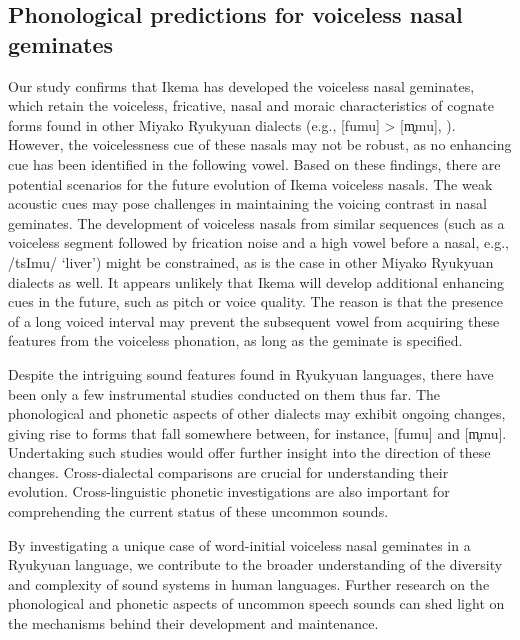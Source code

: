 \documentclass[output=paper]{langscibook}
\begin{document}
\subsection{Phonological predictions for voiceless nasal geminates}
\label{sec:shinohara:5.4}
Our study confirms that Ikema has developed the voiceless nasal geminates, which retain the voiceless, fricative, nasal and moraic characteristics of cognate forms found in other Miyako Ryukyuan dialects (e.g., [fumu] > [m̥mu], ). However, the voicelessness cue of these nasals may not be robust, as no enhancing cue has been identified in the following vowel. Based on these findings, there are potential scenarios for the future evolution of Ikema voiceless nasals. The weak acoustic cues may pose challenges in maintaining the voicing contrast in nasal geminates. The development of voiceless nasals from similar sequences (such as a voiceless segment followed by frication noise and a high vowel before a nasal, e.g., /tsImu/ ‘liver’) might be constrained, as is the case in other Miyako Ryukyuan dialects as well. It appears unlikely that Ikema will develop additional enhancing cues in the future, such as pitch or voice quality. The reason is that the presence of a long voiced interval may prevent the subsequent vowel from acquiring these features from the voiceless phonation, as long as the geminate is specified.

\begin{sloppypar}
Despite the intriguing sound features found in Ryukyuan languages, there have been only a few instrumental studies conducted on them thus far. The phonological and phonetic aspects of other dialects may exhibit ongoing changes, giving rise to forms that fall somewhere between, for instance, [fumu] and [m̥mu]. Undertaking such studies would offer further insight into the direction of these changes. Cross-dialectal comparisons are crucial for understanding their evolution. Cross-linguistic phonetic investigations are also important for comprehending the current status of these uncommon sounds. 
\end{sloppypar}

By investigating a unique case of word-initial voiceless nasal geminates in a Ryukyuan language, we contribute to the broader understanding of the diversity and complexity of sound systems in human languages. Further research on the phonological and phonetic aspects of uncommon speech sounds can shed light on the mechanisms behind their development and maintenance.
\end{document}
